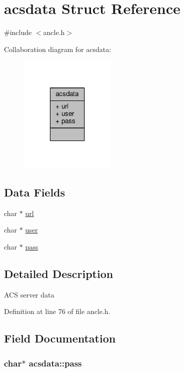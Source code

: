 \hypertarget{structacsdata}{\section{acsdata Struct Reference}
\label{structacsdata}
}


{\ttfamily \#include $<$ancle.\-h$>$}



Collaboration diagram for acsdata\-:\nopagebreak
\begin{figure}[H]
\begin{center}
\leavevmode
\includegraphics[width=130pt]{structacsdata__coll__graph}
\end{center}
\end{figure}
\subsection*{Data Fields}
\begin{DoxyCompactItemize}
\item 
char $\ast$ \hyperlink{structacsdata_a705fb13dc9a0271463e07f15ac785433}{url}
\item 
char $\ast$ \hyperlink{structacsdata_a5a023eb9d5cff7be3357abb6ebdd3172}{user}
\item 
char $\ast$ \hyperlink{structacsdata_aaaf4ce4a1ad46e1d3c8294001cd3caf3}{pass}
\end{DoxyCompactItemize}


\subsection{Detailed Description}
A\-C\-S server data 

Definition at line 76 of file ancle.\-h.



\subsection{Field Documentation}
\hypertarget{structacsdata_aaaf4ce4a1ad46e1d3c8294001cd3caf3}{
\subsubsection[{pass}]{\setlength{\rightskip}{0pt plus 5cm}char$\ast$ acsdata\-::pass}}\label{structacsdata_aaaf4ce4a1ad46e1d3c8294001cd3caf3}


